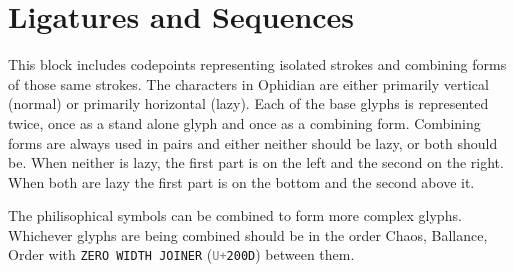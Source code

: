 \documentclass[letterpaper]{article}
\newcommand{\codepoint}[1]{{\tt\textcolor{gray}{U+}#1}}
\newcommand{\glyphname}[1]{{\tt#1}}
\newcommand{\glyphref}[2]{\glyphname{#1} (\codepoint{#2})}
\begin{document}
\section{Ligatures and Sequences}

This block includes codepoints representing isolated strokes and combining forms of those same strokes.  The characters in Ophidian are either primarily vertical (normal) or primarily horizontal (lazy).  Each of the base glyphs is represented twice, once as a stand alone glyph and once as a combining form.  Combining forms are always used in pairs and either neither should be lazy, or both should be.  When neither is lazy, the first part is on the left and the second on the right.  When both are lazy the first part is on the bottom and the second above it.

The philisophical symbols can be combined to form more complex glyphs.  Whichever glyphs are being combined should be in the order Chaos, Ballance, Order with \glyphref{ZERO WIDTH JOINER}{200D} between them.
\end{document}
